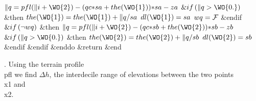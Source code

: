 ${}\|q=\\{pfl}(\|i+\WO{2})-(\\{qc}\ast\\{sa}+\\{the}(\WO{1}))\ast\\{sa}-\\{za}$%
\6
${}\&{if}\,(\|q>\WO{0.})$ \&{then}\1\6
${}\\{the}(\WO{1})=\\{the}(\WO{1})+\|q/\\{sa}$\6
${}\\{dl}(\WO{1})=\\{sa}$\6
${}\\{wq}={\cal F}$\2\6
\&{endif}\6
${}\&{if}\,(\lnot\\{wq})$ \&{then}\1\6
${}\|q=\\{pfl}(\|i+\WO{2})-(\\{qc}\ast\\{sb}+\\{the}(\WO{2}))\ast\\{sb}-\\{zb}$%
\6
${}\&{if}\,(\|q>\WO{0.})$ \&{then}\1\6
${}\\{the}(\WO{2})=\\{the}(\WO{2})+\|q/\\{sb}$\6
${}\\{dl}(\WO{2})=\\{sb}$\2\6
\&{endif}\2\6
\&{endif}\2\6
\&{enddo}\7
\&{return}\2\6
\&{end}\WY\par
\fi %

. Using the terrain profile \\{pfl} we find $\Delta h$, the interdecile
range
of elevations between the two points \\{x1} and \\{x2}.

